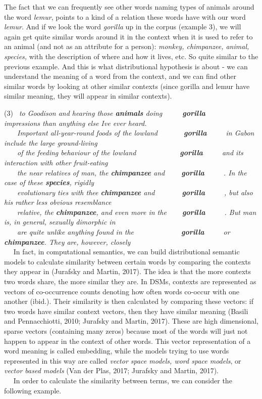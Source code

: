 \documentclass[11pt]{article}
\begin{document}
The fact that we can frequently see other words naming types of animals
around the word \emph{lemur}, points to a kind of a relation these words
have with our word \emph{lemur}. And if we look the word \emph{gorilla}
up in the corpus (example 3), we will again get quite similar words
around it in the context when it is used to refer to an animal (and not
as an attribute for a person): \emph{monkey, chimpanzee, animal,
species,} with the description of where and how it lives, etc. So quite
similar to the previous example. And this is what distributional
hypothesis is about - we can understand the meaning of a word from the
context, and we can find other similar words by looking at other similar
contexts (since gorilla and lemur have similar meaning, they will appear
in similar contexts).

(3)\emph{  to Goodison and hearing those \textbf{animals} doing
     \textbf{gorilla}      impressions than anything else Ive ever
heard.\\
    Important all-year-round foods of the lowland       
\textbf{gorilla}      in Gabon include the large ground-living\\
    of the feeding behaviour of the lowland             \textbf{gorilla}
     and its interaction with other fruit-eating\\
    the near relatives of man, the \textbf{chimpanzee} and
    \textbf{gorilla}      . In the case of these \textbf{species},
rigidly\\
    evolutionary ties with thee \textbf{chimpanzee} and
       \textbf{gorilla}      , but also his rather less obvious
resemblance\\
    relative, the \textbf{chimpanzee}, and even more in the    
\textbf{gorilla}      . But man is, in general, sexually dimorphic in\\
    are quite unlike anything found in the              \textbf{gorilla}
     or \textbf{chimpanzee}. They are, however, closely}\\
    In fact, in computational semantics, we can build distributional
semantic models to calculate similarity between certain words by
comparing the contexts they appear in (Jurafsky and Martin, 2017). The
idea is that the more contexts two words share, the more similar they
are. In DSMs, contexts are represented as vectors of co-occurrence
counts denoting how often words co-occur with one another (ibid.). Their
similarity is then calculated by comparing these vectors: if two words
have similar context vectors, then they have similar meaning (Basili and
Pennacchiotti, 2010; Jurafsky and Martin, 2017). These are high
dimensional, sparse vectors (containing many zeros) because most of the
words will just not happen to appear in the context of other words. This
vector representation of a word meaning is called embedding, while the
models trying to use words represented in this way are called
\emph{vector space models, word space models}, or \emph{vector based
models} (Van der Plas, 2017; Jurafsky and Martin, 2017).\\
   In order to calculate the similarity between terms, we can consider
the following example.
\end{document}
